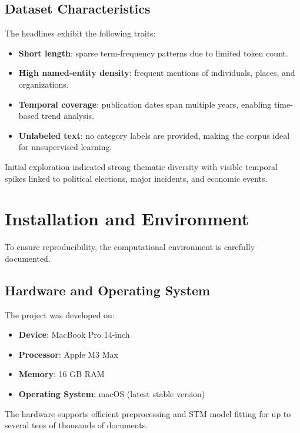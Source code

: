 \documentclass[11pt]{article}
\begin{document}
\subsection{Dataset Characteristics}

The headlines exhibit the following traits:
\begin{itemize}
    \item \textbf{Short length}: sparse term-frequency patterns due to limited token count.
    \item \textbf{High named-entity density}: frequent mentions of individuals, places, and organizations.
    \item \textbf{Temporal coverage}: publication dates span multiple years, enabling time-based trend analysis.
    \item \textbf{Unlabeled text}: no category labels are provided, making the corpus ideal for unsupervised learning.
\end{itemize}

Initial exploration indicated strong thematic diversity with visible temporal spikes linked to political elections, major incidents, and economic events.

\section{Installation and Environment}

To ensure reproducibility, the computational environment is carefully documented.

\subsection{Hardware and Operating System}

The project was developed on:
\begin{itemize}
    \item \textbf{Device}: MacBook Pro 14-inch
    \item \textbf{Processor}: Apple M3 Max
    \item \textbf{Memory}: 16 GB RAM
    \item \textbf{Operating System}: macOS (latest stable version)
\end{itemize}

The hardware supports efficient preprocessing and STM model fitting for up to several tens of thousands of documents.
\end{document}
